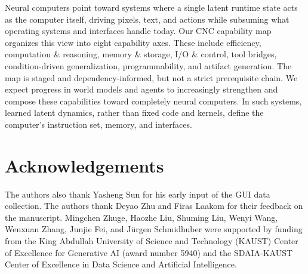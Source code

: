 Neural computers point toward systems where a single latent runtime state acts as the computer itself, driving pixels, text, and actions while subsuming what operating systems and interfaces handle today.
Our CNC capability map organizes this view into eight capability axes.
These include efficiency, computation \& reasoning, memory \& storage, I/O \& control, tool bridges, condition-driven generalization, programmability, and artifact generation.
The map is staged and dependency-informed, but not a strict prerequisite chain.
We expect progress in world models and agents to increasingly strengthen and compose these capabilities toward completely neural computers.
In such systems, learned latent dynamics, rather than fixed code and kernels, define the computer’s instruction set, memory, and interfaces.


\section*{Acknowledgements}
The authors also thank Yasheng Sun for his early input of the GUI data collection. 
%
The authors  thank Deyao Zhu and Firas Laakom for their feedback on the manuscript.  
%
Mingchen Zhuge, Haozhe Liu, Shuming Liu, Wenyi Wang, Wenxuan Zhang, Junjie Fei, and Jürgen Schmidhuber were supported by funding from the King Abdullah University of Science and Technology (KAUST) Center of Excellence for Generative AI (award number 5940) and the SDAIA-KAUST Center of Excellence in Data Science and Artificial Intelligence.
